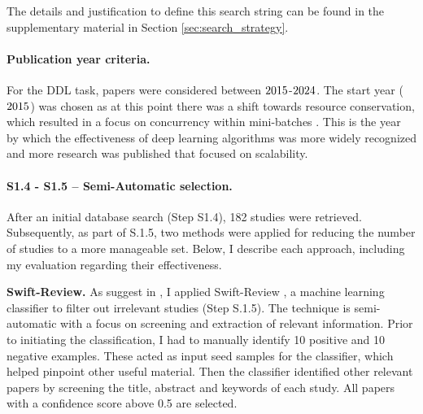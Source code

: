 The details and justification to define this search string can be found in the supplementary
material in Section \ref{sec:search_strategy}. 

\paragraph{Publication year criteria.}
For the DDL task, papers were considered between $2015$-$2024$. The start year
($2015$) was chosen as at this point there was a shift towards resource conservation,
which resulted in a focus on concurrency within mini-batches \cite{ben-nun_demystifying_2020}. This
is the year by which the effectiveness of deep learning algorithms was more widely recognized and
more research was published that focused on scalability.

\paragraph{S1.4 - S1.5 -- Semi-Automatic selection.}
After an initial database search (Step S1.4), 182 studies were retrieved. Subsequently, as part of
S.1.5, two methods were applied for reducing the number of studies to a more manageable set. Below,
I describe each approach, including my evaluation regarding their effectiveness.

\textbf{Swift-Review.}
As suggest in \cite{bolanos_artificial_2024},
I applied Swift-Review \cite{Howard2016SWIFTReviewAT}, a machine learning classifier to filter out
irrelevant studies (Step S.1.5). The technique is semi-automatic
with a focus on screening and extraction of relevant information. Prior to initiating the classification,
I had to manually identify 10 positive and 10 negative examples. These
acted as input seed samples for the classifier, which helped pinpoint other useful material. Then
the classifier identified other relevant papers by screening the title, abstract and keywords of
each study. All papers with a confidence score above 0.5 are selected.

